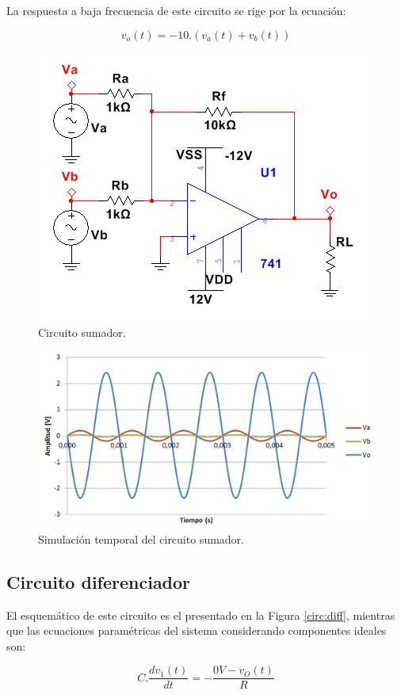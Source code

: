 La respuesta a baja frecuencia de este circuito se rige por la ecuación:

\begin{equation}
v_o(t) = - 10.(v_a(t)+v_b(t))
\end{equation}


\begin{figure}[H]
  \centering
\includegraphics[width=.5\textwidth]{gfx/SUM_CIRC}
  \caption{Circuito sumador.}
  \label{circ:sum}
\end{figure}



\begin{figure}[H]
  \centering
\includegraphics[width=.8\textwidth]{gfx/SUM1}
  \caption{Simulación temporal del circuito sumador.}
  \label{t:sum}
\end{figure}



\subsection{Circuito diferenciador}

El esquemático de este circuito es el presentado en la Figura \ref{circ:diff}, mientras que las ecuaciones paramétricas del sistema considerando componentes ideales son:

\begin{equation*}
C.\frac{dv_1(t)}{dt} = -\frac{0V-v_O(t)}{R}
\end{equation*}


